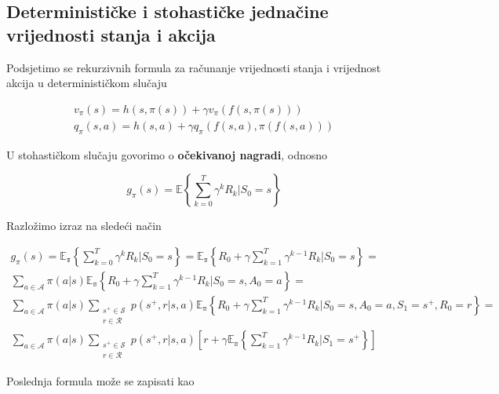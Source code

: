 \documentclass[12pt]{IEEEtran}
\numberwithin{equation}{subsection}
\numberwithin{figure}{subsection}
\theoremstyle{definition}
\numberwithin{example}{section}
\begin{document}
\subsection{\textbf{Deterministi\v{c}ke i stohasti\v{c}ke jedna\v{c}ine vrijednosti stanja i akcija}}

Podsjetimo se rekurzivnih formula za ra\v{c}unanje vrijednosti stanja
i vrijednost akcija u deterministi\v{c}kom slu\v{c}aju

\begin{gather}
    v_{\pi}(s) = h(s, \pi(s)) + \gamma v_{\pi}(f(s, \pi(s)))\\
    q_{\pi}(s, a) = h(s, a) + \gamma q_{\pi}(f(s, a), \pi(f(s, a)))
\end{gather}

U stohasti\v{c}kom slu\v{c}aju govorimo o \textbf{o\v{c}ekivanoj nagradi},
odnosno

\begin{equation}
    g_{\pi}(s) = \mathbb{E}\left\{\sum_{k = 0}^{T}{\gamma^{k}R_{k}} | S_{0} = s\right\}
\end{equation}

Razlo\v{z}imo izraz na slede\'{c}i na\v{c}in

\begin{equation}
    \begin{gathered}
        g_{\pi}(s) = \mathbb{E_{\pi}}\left\{\sum_{k = 0}^{T}{\gamma^{k}R_{k}} | S_{0} = s\right\} = \mathbb{E_{\pi}}\left\{R_{0} + \gamma \sum_{k = 1}^{T}{\gamma^{k - 1}R_{k}} | S_{0} = s\right\} = \\
        \sum_{a \in \mathcal{A}}{\pi(a | s)\mathbb{E_{\pi}}\left\{R_{0} + \gamma \sum_{k = 1}^{T}{\gamma^{k - 1}R_{k}} | S_{0} = s, A_{0} = a\right\}} =\\
        \sum_{a \in \mathcal{A}}{\pi(a | s) \sum_{\substack{s^{+} \in \mathcal{S}\\r \in \mathcal{R}}}{p(s^{+}, r | s, a) \mathbb{E_{\pi}}\left\{R_{0} + \gamma \sum_{k = 1}^{T}{\gamma^{k - 1}R_{k}} | S_{0} = s, A_{0} = a, S_{1} = s^{+}, R_{0} = r\right\}}} =\\
        \sum_{a \in \mathcal{A}}{\pi(a | s) \sum_{\substack{s^{+} \in \mathcal{S}\\r \in \mathcal{R}}}{p(s^{+}, r | s, a) \left[r + \gamma \mathbb{E_{\pi}} \left\{ \sum_{k = 1}^{T}{\gamma^{k - 1}R_{k}} | S_{1} = s^{+} \right\} \right]}}
    \end{gathered}
\end{equation}

Poslednja formula mo\v{z}e se zapisati kao
\end{document}
